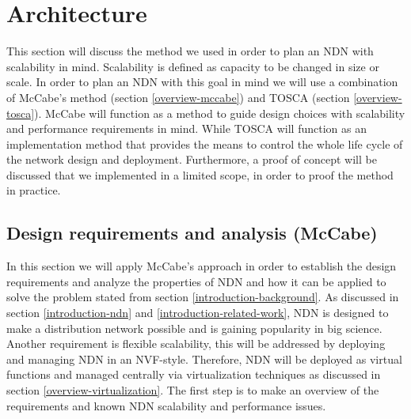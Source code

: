 \section{Architecture}



\label{planning-ndn}

This section will discuss the method we used in order to plan an NDN with scalability in mind. Scalability is defined as capacity to be changed in size or scale. In order to plan an NDN with this goal in mind we will use a combination of McCabe's method (section \ref{overview-mccabe}) and TOSCA (section \ref{overview-tosca}). McCabe will function as a method to guide design choices with scalability and performance requirements in mind. While TOSCA will function as an implementation method that provides the means to control the whole life cycle of the network design and deployment. Furthermore, a proof of concept will be discussed that we implemented in a limited scope, in order to proof the method in practice.


\subsection{Design requirements and analysis (McCabe)}
\label{planning-requirements}
In this section we will apply McCabe's approach in order to establish the design requirements and analyze the properties of NDN and how it can be applied to solve the problem stated from section \ref{introduction-background}. As discussed in section \ref{introduction-ndn} and \ref{introduction-related-work}, NDN is designed to make a distribution network possible and is gaining popularity in big science. Another requirement is flexible scalability, this will be addressed by deploying and managing NDN in an NVF-style. Therefore, NDN will be deployed as virtual functions and managed centrally via virtualization techniques as discussed in section \ref{overview-virtualization}. The first step is to make an overview of the requirements and known NDN scalability and performance issues.

